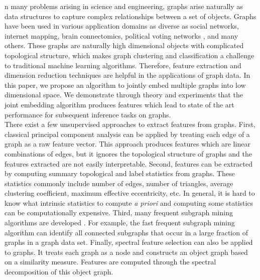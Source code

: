 \documentclass[10pt,journal,compsoc]{IEEEtran}
\begin{document}
\IEEEdisplaynontitleabstractindextext
\IEEEpeerreviewmaketitle


\noindent {}n many problems arising in science and engineering, graphs arise naturally as data structures to capture complex relationships between a set of objects. Graphs have been used in various application domains as diverse as social networks\cite{otte2002social}, internet mapping\cite{govindan2000heuristics}, brain connectomics\cite{bullmore2011brain}, political voting networks \cite{ward2011network},  and many others. These graphs are naturally high dimensional objects with complicated topological structure, which makes graph clustering and classification a challenge to traditional machine learning algorithms. Therefore, feature extraction and dimension reduction techniques are helpful in the applications of graph data. In this paper, we propose an algorithm to jointly embed multiple graphs into low dimensional space. We demonstrate through theory and experiments that the joint embedding algorithm produces features which lead to state of the art performance for subsequent inference tasks on graphs.  \\

\noindent There exist a few unsupervised approaches to extract features from graphs. First, classical principal component analysis can be applied by treating each edge of a graph as a raw feature vector\cite{jolliffe2002principal}. This approach produces features which are linear combinations of edges, but it ignores the topological structure of graphs and the features extracted are not easily interpretable. Second, features can be extracted by computing summary topological and label statistics from graphs\cite{li2011graph}. These statistics commonly include number of edges, number of triangles, average clustering coefficient, maximum effective eccentricity, etc. In general, it is hard to know what intrinsic statistics to compute \textit{a priori} and computing some statistics can be computationally expensive. Third, many frequent subgraph mining algorithms are developed \cite{jiang2013survey}. For example, the fast frequent subgraph mining algorithm can identify all connected subgraphs that occur in a large fraction of graphs in a graph data set\cite{huan2003efficient}. Finally, spectral feature selection can also be applied to graphs. It treats each graph as a node and constructs an object graph based on a similarity measure. Features are computed through the spectral decomposition of this object graph\cite{zhao2007spectral}. \\
\end{document}
